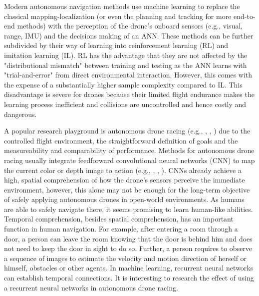 Modern autonomous navigation methods use machine learning
to replace the classical mapping-localization 
(or even the planning and tracking for more end-to-end methods) 
with the perception of the drone's onboard sensors
(e.g., visual, range, IMU)
and the decisions making of an ANN.
These methods can be further subdivided by their way of learning
into reinforcement learning (RL) and imitation learning (IL).
RL has the advantage that
they are not affected 
by the "distributional mismatch" \cite{RobotAutonomy2} 
between training and testing as 
the ANN learns with "trial-and-error" \cite{Sadeghi2016} 
from direct environmental interaction.
However, this comes with the expense of a
substantially higher sample complexity 
compared to IL. \cite{Zhu2017}
This disadvantage is severe for drones because 
their limited flight endurance 
makes the learning process inefficient 
and collisions are uncontrolled and 
hence costly and dangerous. \cite{Sadeghi2016}

A popular research playground is autonomous drone racing
(e.g., \cite{Moon2019}, \cite{Jung2018}, \cite{Song2021})
due to the controlled flight environment,
the straightforward definition of goals
and the measureability and comparability of performance.
Methods for autonomous drone racing usually
integrate feedforward
convolutional neural networks (CNN) 
to map the current color or depth image to action
(e.g., \cite{RojasPerez2020}, \cite{Kaufmann2019}, \cite{Jung2018a}).
CNNs already achieve 
a high, spatial comprehension of how the drone's sensors perceive
the immediate environment, 
however, this alone may not
be enough for the long-term objective of safely 
applying autonomous drones in open-world environments.
As humans are able to safely navigate there,
it seems promising to learn human-like abilities.
Temporal comprehension,
besides spatial comprehension,
has an important function in human navigation. 
For example, 
after entering a room through a door, 
a person can leave the room knowing 
that the door is behind him and 
does not need to keep the door in sight to do so.
Further, a person requires 
to observe a sequence of images to
estimate the velocity and motion direction of herself or himself, 
obstacles or other agents.
In machine learning, recurrent neural networks
can establish temporal connections.
It is interesting to research the 
effect of using a recurrent neural networks in autonomous drone racing.









